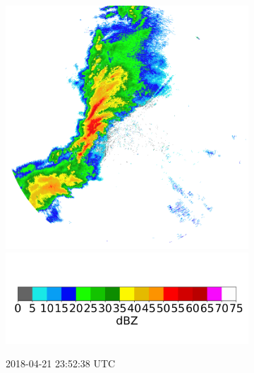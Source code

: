 \begin{figure}[ht]
\begin{subfigure}[b]{0.3\textwidth}
		\includegraphics[width=\textwidth]{./thesis_code/plots/midlothian.tx-20180421-235238-ref.png}
		\includegraphics[width=\textwidth]{./thesis_code/plots/dfw_colormap.png}
		\caption{2018-04-21 23:52:38 UTC}
		\label{fig:bestmodel_translation3}
	\end{subfigure}
	\\
	\begin{subfigure}[b]{0.3\textwidth}

\end{subfigure}
\end{figure}
